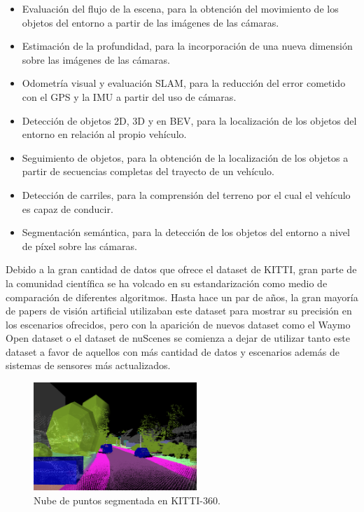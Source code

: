 \begin{itemize}
    \item Evaluación del flujo de la escena, para la obtención del movimiento de los objetos del entorno a partir de las imágenes de las cámaras.
    \item Estimación de la profundidad, para la incorporación de una nueva dimensión sobre las imágenes de las cámaras.
    \item Odometría visual y evaluación SLAM, para la reducción del error cometido con el \ac{GPS} y la \ac{IMU} a partir del uso de cámaras.
    \item Detección de objetos 2D, 3D y en \ac{BEV}, para la localización de los objetos del entorno en relación al propio vehículo.
    \item Seguimiento de objetos, para la obtención de la localización de los objetos a partir de secuencias completas del trayecto de un vehículo.
    \item Detección de carriles, para la comprensión del terreno por el cual el vehículo es capaz de conducir.
    \item Segmentación semántica, para la detección de los objetos del entorno a nivel de píxel sobre las cámaras.
\end{itemize}

Debido a la gran cantidad de datos que ofrece el dataset de KITTI, gran parte de la comunidad científica se ha volcado en su estandarización como medio de comparación de diferentes algoritmos. Hasta hace un par de años, la gran mayoría de papers de visión artificial utilizaban este dataset para mostrar su precisión en los escenarios ofrecidos, pero con la aparición de nuevos dataset como el Waymo Open dataset \cite{waymo_dataset} o el dataset de nuScenes \cite{nuscenes_dataset} se comienza a dejar de utilizar tanto este dataset a favor de aquellos con más cantidad de datos y escenarios además de sistemas de sensores más actualizados.

\begin{figure}[H]
    \centering
    \includegraphics[width=0.55\textwidth]{Book/figures/4_kitti/kitti360_pcl.png}
    \caption{Nube de puntos segmentada en KITTI-360.}
    \label{fig:Nube de puntos segmentada en KITTI-360.}
\end{figure}

